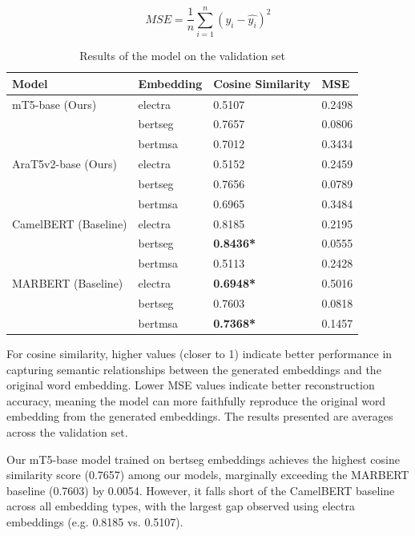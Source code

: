 \documentclass[15pt]{article}
\begin{document}
\begin{equation}\label{eq:mse}
    MSE = \frac{1}{n} \sum_{i=1}^{n} (y_i - \hat{y_i})^2
\end{equation}

\begin{table}[H]
    \centering
    \caption{Results of the model on the validation set}
    \label{table:results}
    \renewcommand{\arraystretch}{1.5}%
    \begin{tabularx}{\textwidth}{|>{\raggedright}X|>{\raggedright\arraybackslash}X|X|X|}
        \hline
        \textbf{Model} & \textbf{Embedding} & \textbf{Cosine Similarity} & \textbf{MSE} \\
        \hline
        mT5-base (Ours) & electra & 0.5107 & 0.2498 \\\cline{2-4}
        & bertseg & 0.7657 & 0.0806 \\\cline{2-4}
        & bertmsa & 0.7012 & 0.3434 \\\cline{2-4}
        \hline
        AraT5v2-base (Ours) & electra & 0.5152 & 0.2459 \\\cline{2-4}
        & bertseg & 0.7656 & 0.0789 \\\cline{2-4}
        & bertmsa & 0.6965 & 0.3484 \\\cline{2-4}
        \hline
        CamelBERT (Baseline) & electra & 0.8185 & 0.2195 \\\cline{2-4}
        & bertseg & \textbf{0.8436*} & 0.0555 \\\cline{2-4}
        & bertmsa & 0.5113 & 0.2428 \\\cline{2-4}
        \hline
        MARBERT (Baseline) & electra & \textbf{0.6948*} & 0.5016 \\\cline{2-4}
        & bertseg & 0.7603 & 0.0818 \\\cline{2-4}
        & bertmsa & \textbf{0.7368*} & 0.1457 \\\cline{2-4}
        \hline
    \end{tabularx}
\end{table}

For cosine similarity, higher values (closer to 1) indicate better performance in capturing semantic relationships between the generated embeddings and the original word embedding. Lower MSE values indicate better reconstruction accuracy, meaning the model can more faithfully reproduce the original word embedding from the generated embeddings. The results presented are averages across the validation set.

Our mT5-base model trained on bertseg embeddings achieves the highest cosine similarity score (0.7657) among our models, marginally exceeding the MARBERT baseline (0.7603) by 0.0054. However, it falls short of the CamelBERT baseline across all embedding types, with the largest gap observed using electra embeddings (e.g. 0.8185 vs. 0.5107).
\end{document}
